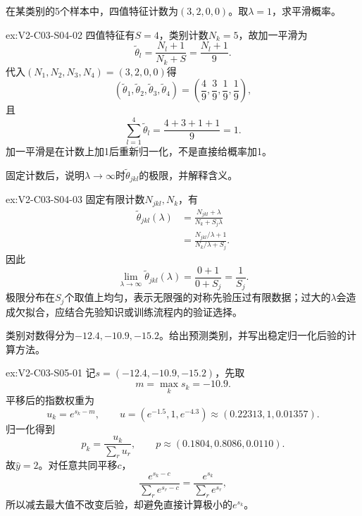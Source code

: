 \begin{SLChapterExercisePairSection}
\begin{exercise}\label{ex:V2-C03-S04-02}
在某类别的5个样本中，四值特征计数为$(3,2,0,0)$。取$\lambda=1$，求平滑概率。
\end{exercise}
\ifSLFullEdition
{}\label{sol:V2-C03-S04-02}
\begin{chapterexercisesolution}{ex:V2-C03-S04-02}
四值特征有$S=4$，类别计数$N_k=5$，故加一平滑为
\[
\widetilde\theta_l
=\frac{N_l+1}{N_k+S}
=\frac{N_l+1}{9}.
\]
代入$(N_1,N_2,N_3,N_4)=(3,2,0,0)$得
\[
(\widetilde\theta_1,\widetilde\theta_2,
\widetilde\theta_3,\widetilde\theta_4)
=\left(\frac49,\frac39,\frac19,\frac19\right),
\]
且
\[
\sum_{l=1}^{4}\widetilde\theta_l
=\frac{4+3+1+1}{9}=1.
\]
加一平滑是在计数上加1后重新归一化，不是直接给概率加1。
\end{chapterexercisesolution}
\fi

\begin{exercise}\label{ex:V2-C03-S04-03}
固定计数后，说明$\lambda\to\infty$时$\widetilde\theta_{jkl}$的极限，并解释含义。
\end{exercise}
\ifSLFullEdition
{}\label{sol:V2-C03-S04-03}
\begin{chapterexercisesolution}{ex:V2-C03-S04-03}
固定有限计数$N_{jkl},N_k$，有
\[
\begin{aligned}
\widetilde\theta_{jkl}(\lambda)
&=\frac{N_{jkl}+\lambda}{N_k+S_j\lambda}\\
&=\frac{N_{jkl}/\lambda+1}{N_k/\lambda+S_j}.
\end{aligned}
\]
因此
\[
\lim_{\lambda\to\infty}\widetilde\theta_{jkl}(\lambda)
=\frac{0+1}{0+S_j}
=\frac1{S_j}.
\]
极限分布在$S_j$个取值上均匀，表示无限强的对称先验压过有限数据；过大的$\lambda$会造成欠拟合，应结合先验知识或训练流程内的验证选择。
\end{chapterexercisesolution}
\fi

\begin{exercise}\label{ex:V2-C03-S05-01}
类别对数得分为$-12.4,-10.9,-15.2$。给出预测类别，并写出稳定归一化后验的计算方法。
\end{exercise}
\ifSLFullEdition
{}\label{sol:V2-C03-S05-01}
\begin{chapterexercisesolution}{ex:V2-C03-S05-01}
记$s=(-12.4,-10.9,-15.2)$，先取
\[
m=\max_k s_k=-10.9.
\]
平移后的指数权重为
\[
u_k=e^{s_k-m},
\qquad
u=(e^{-1.5},1,e^{-4.3})
\approx(0.22313,1,0.01357).
\]
归一化得到
\[
p_k=\frac{u_k}{\sum_ru_r},
\qquad
p\approx(0.1804,0.8086,0.0110).
\]
故$\widehat y=2$。对任意共同平移$c$，
\[
\frac{e^{s_k-c}}{\sum_re^{s_r-c}}
=\frac{e^{s_k}}{\sum_re^{s_r}},
\]
所以减去最大值不改变后验，却避免直接计算极小的$e^{s_k}$。
\end{chapterexercisesolution}
\fi


\end{SLChapterExercisePairSection}
